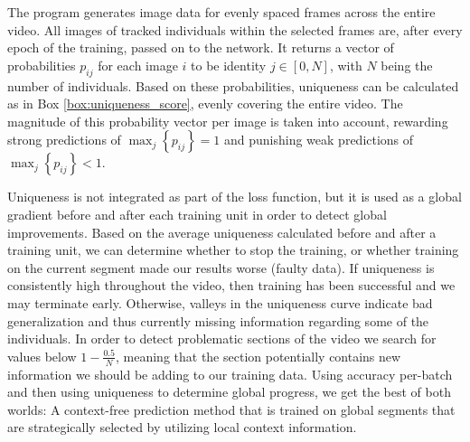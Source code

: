 \documentclass[9pt,lineno]{elife}
\newcommand{\argmax}[1]{\underset{#1}{\operatorname{arg}\,\operatorname{max}}\;}
\begin{document}
%
The program generates image data for evenly spaced frames across the entire video. All images of tracked individuals within the selected frames are, after every epoch of the training, passed on to the network. It returns a vector of probabilities $p_{ij}$ for each image $i$ to be identity $j\in[0,N]$, with $N$ being the number of individuals. Based on these probabilities, uniqueness can be calculated as in Box \ref{box:uniqueness_score}, evenly covering the entire video. The magnitude of this probability vector per image is taken into account, rewarding strong predictions of $\max_j \left\{ p_{ij} \right\}=1$ and punishing weak predictions of $\max_j \left\{ p_{ij} \right\} <1$.

Uniqueness is not integrated as part of the loss function, but it is used as a global gradient before and after each training unit in order to detect global improvements. Based on the average uniqueness calculated before and after a training unit, we can determine whether to stop the training, or whether training on the current segment made our results worse (faulty data). If uniqueness is consistently high throughout the video, then training has been successful and we may terminate early. Otherwise, valleys in the uniqueness curve indicate bad generalization and thus currently missing information regarding some of the individuals. In order to detect problematic sections of the video we search for values below $1-\frac{0.5}{N}$, meaning that the section potentially contains new information we should be adding to our training data. Using accuracy per-batch and then using uniqueness to determine global progress, we get the best of both worlds: A context-free prediction method that is trained on global segments that are strategically selected by utilizing local context information.

\end{document}
